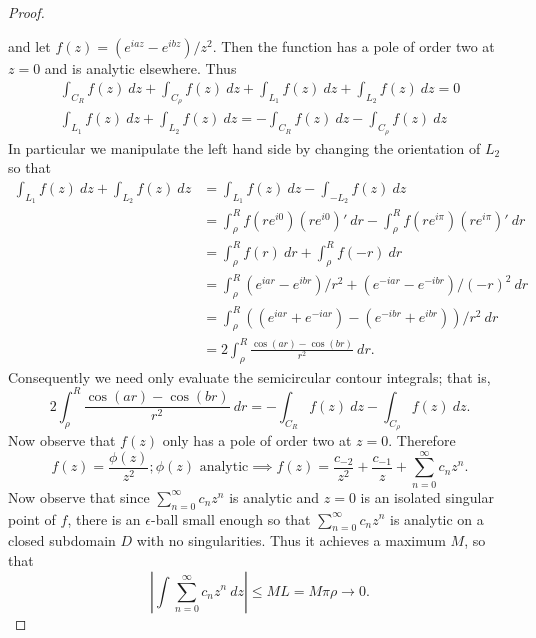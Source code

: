 \documentclass[11pt]{amsart}
\theoremstyle{definition}
\numberwithin{theorem}{section}
\numberwithin{definition}{section}
\numberwithin{equation}{section}
\begin{document}
\begin{proof}
\begin{center}
\begin{tikzpicture}
\end{tikzpicture}
\end{center}
	and let $f(z) = (e^{iaz} - e^{ibz})/z^2$. Then the function has a pole of order two at $z = 0$ and is analytic elsewhere. Thus
	\begin{equation*}
	\begin{aligned}
		\int_{C_R} f(z)\ dz + \int_{C_\rho} f(z)\ dz + \int_{L_1} f(z)\ dz  + \int_{L_2} f(z)\ dz = 0 \\
		\int_{L_1} f(z)\ dz  + \int_{L_2} f(z)\ dz  = -\int_{C_R} f(z)\ dz  -\int_{C_\rho} f(z)\ dz 
	\end{aligned}
	\end{equation*}
	In particular we manipulate the left hand side by changing the orientation of $L_2$ so that
	\begin{equation*}
	\begin{aligned}
		\int_{L_1} f(z)\ dz  + \int_{L_2} f(z)\ dz &= \int_{L_1} f(z)\ dz  - \int_{-L_2} f(z)\ dz\\
		&= \int_\rho^R f(re^{i0})(re^{i0})'\ dr - \int_\rho^R f(re^{i\pi})(re^{i\pi})'\ dr \\
		&= \int_\rho^R f(r)\ dr + \int_\rho^R f(-r)\ dr \\
		&= \int_\rho^R (e^{iar} - e^{ibr})/r^2 + (e^{-iar} - e^{-ibr})/(-r)^2\ dr \\
		&= \int_\rho^R ((e^{iar}  + e^{-iar}) - (e^{-ibr} +e^{ibr}))/r^2 \ dr \\
		&= 2\int_\rho^R \frac{\cos(ar) - \cos(br)}{r^2} \ dr.
	\end{aligned}
	\end{equation*}
	Consequently we need only evaluate the semicircular contour integrals; that is,
	\begin{equation*}
		2\int_\rho^R \frac{\cos(ar) - \cos(br)}{r^2} \ dr =  -\int_{C_R} f(z)\ dz  -\int_{C_\rho} f(z)\ dz.
	\end{equation*}
	Now observe that $f(z)$ only has a pole of order two at $z = 0.$
	Therefore \begin{equation*}
		f(z) = \frac{\phi(z)}{z^2}; \phi(z) \text{ analytic} \implies f(z) = \frac{c_{-2}}{z^2} + \frac{c_{-1}}{z} + \sum_{n=0}^\infty c_{n}z^n.
	\end{equation*}
	Now observe that since $\sum_{n=0}^\infty c_{n}z^n$ is analytic and $z = 0$ is an isolated singular point of $f$, there is an $\epsilon$-ball small enough so that $\sum_{n=0}^\infty c_{n}z^n$ is analytic on a closed subdomain $D$ with no singularities. Thus it achieves a maximum $M$, so that $$\left|\int \sum_{n=0}^\infty c_{n}z^n\ dz\right| \leq  ML = M\pi \rho \to 0.$$

\end{proof}
\end{document}

